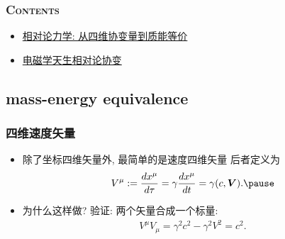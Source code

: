 \documentclass[aspectratio=169, 10pt, utf8, mathserif]{beamer}
\def\hilite<#1>{\temporal<#1>{\color{blue!80}}{\color{blue!85!white}}{\color{black}}}%
\numberwithin{equation}{section} %
\numberwithin{figure}{section} %
\begin{document}
\begin{frame}%
    \frametitle{\textsc{Contents}} \vspace{-1.05cm}\label{sec:4}
    \begin{multicols}{2}
    \begin{minipage}[t]{0.55\textwidth}
    \end{minipage}

    \begin{minipage}[t]{0.55\textwidth}
    \vspace{1.0cm}
    \begin{spacing}{1.05} %
    \begin{itemize}
        \item\hyperlink{subsec:4-1}{相对论力学: 从四维协变量到质能等价}
        \item\hyperlink{subsec:4-2}{电磁学天生相对论协变}
    \end{itemize}
    \end{spacing}
    \end{minipage}
    \end{multicols}
\end{frame}

\subsection[相对论力学: 从四维协变量到质能等价]{mass-energy equivalence}\label{subsec:4-1}

\begin{frame}
\frametitle{\textsc{四维速度矢量}}
\begin{itemize}
\hilite<1>\item 除了坐标四维矢量外, 最简单的是速度四维矢量 后者定义为
\begin{align}
V^\mu:=\frac{dx^\mu}{d\tau}=\gamma\frac{dx^\mu}{dt}=\gamma(c,\bm{V}).\pause
\end{align}
\hilite<2>\item 为什么这样做? 验证: 两个矢量合成一个标量:
\begin{align}
V^\mu V_\mu=\gamma^2c^2-\gamma^2 V^2=c^2.\nonumber
\end{align}

\end{itemize}
\end{frame}
\end{document}
